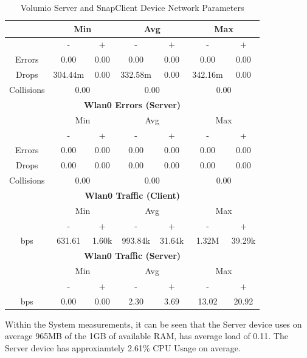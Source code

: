 \documentclass[11pt,a4paper,headinclude=false,footinclude=false]{scrreprt}
\begin{document}
\begin{table}[H]
\begin{tabular}{||c|c|c|c|c|c|c||}
    \hline\hline
      & \multicolumn{2}{|c|}{Min} & \multicolumn{2}{|c|}{Avg} & \multicolumn{2}{|c|}{Max} \\
    \hline
      & - & + & - & + & - & + \\
    \hline
    Errors  & 0.00 & 0.00 & 0.00 & 0.00 & 0.00 & 0.00 \\
    \hline
    Drops & 304.44m & 0.00 & 332.58m & 0.00 & 342.16m & 0.00 \\
    \hline
    Collisions & \multicolumn{2}{|c|}{0.00} & \multicolumn{2}{|c|}{0.00} & \multicolumn{2}{|c|}{0.00} \\
    \hline\hline
    \multicolumn{7}{|c|}{\textbf{Wlan0 Errors (Server)}} \\
    \hline\hline
      & \multicolumn{2}{|c|}{Min} & \multicolumn{2}{|c|}{Avg} & \multicolumn{2}{|c|}{Max} \\
    \hline
      & - & + & - & + & - & + \\
    \hline
    Errors  & 0.00 & 0.00 & 0.00 & 0.00 & 0.00 & 0.00 \\
    \hline
    Drops & 0.00 & 0.00 & 0.00 & 0.00 & 0.00 & 0.00 \\
    \hline
    Collisions & \multicolumn{2}{|c|}{0.00} & \multicolumn{2}{|c|}{0.00} & \multicolumn{2}{|c|}{0.00} \\
    \hline\hline
    \multicolumn{7}{|c|}{\textbf{Wlan0 Traffic (Client)}} \\
    \hline\hline
      & \multicolumn{2}{|c|}{Min} & \multicolumn{2}{|c|}{Avg} & \multicolumn{2}{|c|}{Max} \\
    \hline
      & - & + & - & + & - & + \\
    \hline
    bps  & 631.61 & 1.60k & 993.84k & 31.64k & 1.32M & 39.29k \\
    \hline\hline
    \multicolumn{7}{|c|}{\textbf{Wlan0 Traffic (Server)}} \\
    \hline\hline
      & \multicolumn{2}{|c|}{Min} & \multicolumn{2}{|c|}{Avg} & \multicolumn{2}{|c|}{Max} \\
    \hline
      & - & + & - & + & - & + \\
    \hline
    bps  & 0.00 & 0.00 & 2.30 & 3.69 & 13.02 & 20.92 \\
    \hline\hline
    \end{tabular}
    \caption{Volumio Server and SnapClient Device Network Parameters}
    \label{VolumioclientserverNetTab}
\end{table}

Within the System measurements, it can be seen that the Server device
uses on average 965MB of the 1GB of available RAM, has average load of
0.11. The Server device has approxiamtely 2.61\% CPU Usage on average.
\end{document}
